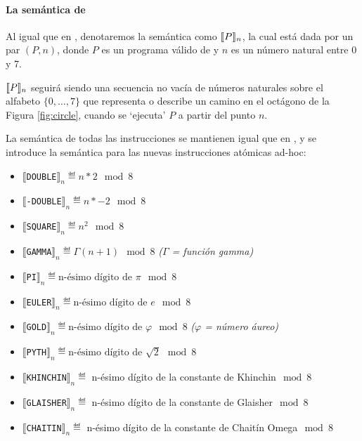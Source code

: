 \paragraph{La semántica de \gramgeoprima}

Al igual que en \gramgeo, denotaremos la semántica como $\llbracket P\rrbracket_n$, la cual está dada por un par $(P,n)$, donde $P$ es un programa válido de \gramgeoprima y $n$ es un número natural entre 0 y 7.

$\llbracket P\rrbracket_n$ seguirá siendo una secuencia no vacía de números naturales sobre el alfabeto $\{0,\dots,7\}$ que representa o describe un camino en el octágono de la Figura \ref{fig:circle}, cuando se `ejecuta' $P$ a partir del punto $n$. 

La semántica de todas las instrucciones se mantienen igual que en \gramgeo, y se introduce la semántica para las nuevas instrucciones atómicas ad-hoc:

\begin{itemize}
\item $\llbracket$\verb#DOUBLE#$\rrbracket_n  \eqdef  n * 2 \mod 8$ 
\item $\llbracket$\verb#-DOUBLE#$\rrbracket_n  \eqdef  n * -2 \mod 8$  
\item $\llbracket$\verb#SQUARE#$\rrbracket_n  \eqdef  n^2 \mod 8$  
\item $\llbracket$\verb#GAMMA#$\rrbracket_n  \eqdef  \Gamma(n+1) \mod 8$  \textit{($\Gamma$ = función gamma)}
\item $\llbracket$\verb#PI#$\rrbracket_n  \eqdef  \text{n-ésimo dígito de } \pi \mod 8$  

\item $\llbracket$\verb#EULER#$\rrbracket_n  \eqdef  \text{n-ésimo dígito de } e \mod 8$  
\item $\llbracket$\verb#GOLD#$\rrbracket_n  \eqdef  \text{n-ésimo dígito de } \varphi \mod 8$  \textit{($\varphi$ = número áureo)}
\item $\llbracket$\verb#PYTH#$\rrbracket_n  \eqdef \text{n-ésimo dígito de } \sqrt{2} \mod 8$
\item $\llbracket$\verb#KHINCHIN#$\rrbracket_n  \eqdef  $ n-ésimo dígito de la constante de Khinchin$ \mod 8$  
\item $\llbracket$\verb#GLAISHER#$\rrbracket_n  \eqdef  $ n-ésimo dígito de la constante de Glaisher$ \mod 8$  
\item $\llbracket$\verb#CHAITIN#$\rrbracket_n  \eqdef
$ n-ésimo dígito de la constante de Chaitín Omega$ \mod 8$  
\end{itemize}

